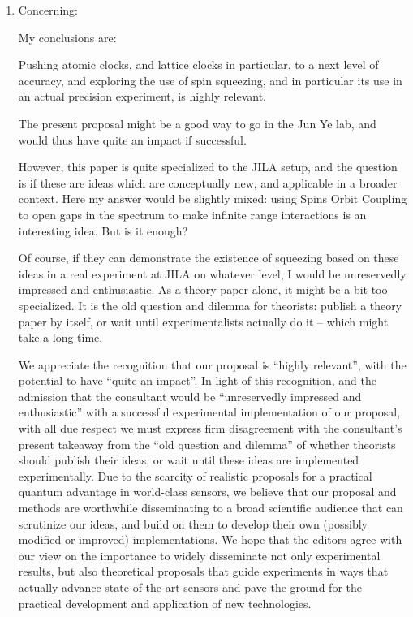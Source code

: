 \documentclass[preprint,superscriptaddress]{revtex4-2}
\newcommand{\blue}[1]{{\color{blue} #1}}
\begin{document}
\begin{enumerate}
\item Concerning:

  \blue{My conclusions are:}

  \blue{Pushing atomic clocks, and lattice clocks in particular, to a
    next level of accuracy, and exploring the use of spin squeezing,
    and in particular its use in an actual precision experiment, is
    highly relevant.}

  \blue{The present proposal might be a good way to go in the Jun Ye
    lab, and would thus have quite an impact if successful.}

  \blue{However, this paper is quite specialized to the JILA setup,
    and the question is if these are ideas which are conceptually new,
    and applicable in a broader context. Here my answer would be
    slightly mixed: using Spins Orbit Coupling to open gaps in the
    spectrum to make infinite range interactions is an interesting
    idea. But is it enough?}

  \blue{Of course, if they can demonstrate the existence of squeezing
    based on these ideas in a real experiment at JILA on whatever
    level, I would be unreservedly impressed and enthusiastic. As a
    theory paper alone, it might be a bit too specialized. It is the
    old question and dilemma for theorists: publish a theory paper by
    itself, or wait until experimentalists actually do it -- which
    might take a long time.}

  We appreciate the recognition that our proposal is ``highly
  relevant'', with the potential to have ``quite an impact''.  In
  light of this recognition, and the admission that the consultant
  would be ``unreservedly impressed and enthusiastic'' with a
  successful experimental implementation of our proposal, with all due
  respect we must express firm disagreement with the consultant's
  present takeaway from the ``old question and dilemma'' of whether
  theorists should publish their ideas, or wait until these ideas are
  implemented experimentally.  Due to the scarcity of realistic
  proposals for a practical quantum advantage in world-class sensors,
  we believe that our proposal and methods are worthwhile
  disseminating to a broad scientific audience that can scrutinize our
  ideas, and build on them to develop their own (possibly modified or
  improved) implementations.  We hope that the editors agree with our
  view on the importance to widely disseminate not only experimental
  results, but also theoretical proposals that guide experiments in
  ways that actually advance state-of-the-art sensors and pave the
  ground for the practical development and application of new
  technologies.

\end{enumerate}
\end{document}
